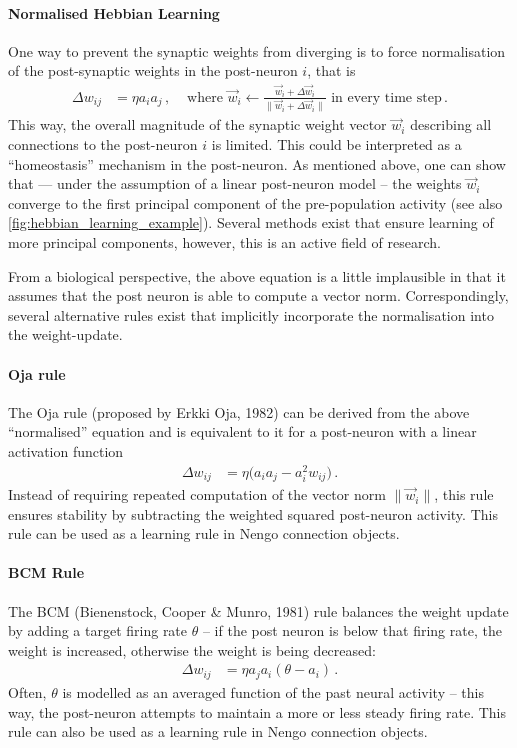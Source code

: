 \documentclass[10pt,letterpaper,oneside]{article}
\begin{document}
\paragraph{Normalised Hebbian Learning}
One way to prevent the synaptic weights from diverging is to force normalisation of the post-synaptic weights in the post-neuron $i$, that is
\begin{align*}
	\Delta w_{ij} &= \eta a_i a_j \,, & \text{ where } \vec w_{i} \gets \frac{\vec w_i + \Delta \vec w_{i}}{\|\vec w_i + \Delta \vec w_{i}\|} \text{ in every time step}\,.
\end{align*}
This way, the overall magnitude of the synaptic weight vector $\vec w_{i}$ describing all connections to the post-neuron $i$ is limited. This could be interpreted as a \enquote{homeostasis} mechanism in the post-neuron. As mentioned above, one can show that --- under the assumption of a linear post-neuron model -- the weights $\vec w_i$ converge to the first principal component of the pre-population activity (see also \cref{fig:hebbian_learning_example}). Several methods exist that ensure learning of more principal components, however, this is an active field of research.

From a biological perspective, the above equation is a little implausible in that it assumes that the post neuron is able to compute a vector norm. Correspondingly, several alternative rules exist that implicitly incorporate the normalisation into the weight-update.

\paragraph{Oja rule}
The Oja rule (proposed by Erkki Oja, 1982) can be derived from the above \enquote{normalised} equation and is equivalent to it for a post-neuron with a linear activation function
\begin{align*}
\Delta w_{ij} &= \eta \big(a_i a_j - a_i^2 w_{ij}\big) \,.
\end{align*}
Instead of requiring repeated computation of the vector norm $\|\vec w_i\|$, this rule ensures stability by subtracting the weighted squared post-neuron activity. This rule can be used as a learning rule in Nengo connection objects.

\paragraph{BCM Rule}
The BCM (Bienenstock, Cooper \& Munro, 1981) rule balances the weight update by adding a target firing rate $\theta$ -- if the post neuron is below that firing rate, the weight is increased, otherwise the weight is being decreased:
\begin{align*}
	\Delta w_{ij} &= \eta a_j a_i (\theta - a_i) \,.
\end{align*}
Often, $\theta$ is modelled as an averaged function of the past neural activity -- this way, the post-neuron attempts to maintain a more or less steady firing rate. This rule can also be used as a learning rule in Nengo connection objects.
\end{document}
